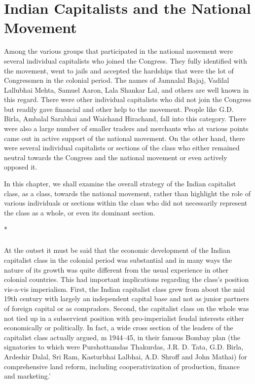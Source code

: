 
\chapter{Indian Capitalists and the National Movement}

Among the various groups that participated in the national movement were several individual capitalists who joined the Congress. They fully identified with the movement, went to jails and accepted the hardships that were the lot of Congressmen in the colonial period. The names of Jamnalal Bajaj, Vadilal Lallubhai Mehta, Samuel Aaron, Lala Shankar Lal, and others are well known in this regard. There were other individual capitalists who did not join the Congress but readily gave financial and other help to the movement. People like G.D. Birla, Ambalal Sarabhai and Waichand Hirachand, fall into this category. There were also a large number of smaller traders and merchants who at various points came out in active support of the national movement. On the other hand, there were several individual capitalists or sections of the class who either remained neutral towards the Congress and the national movement or even actively opposed it. 

In this chapter, we shall examine the overall strategy of the Indian capitalist class, as a class, towards the national movement, rather than highlight the role of various individuals or sections within the class who did not necessarily represent the class as a whole, or even its dominant section.

\begin{center}*\end{center}

\paragraph*{}

At the outset it must be said that the economic development of the Indian capitalist class in the colonial period was substantial and in many ways the nature of its growth was quite different from the usual experience in other colonial countries. This had important implications regarding the class's position vis-a-vis imperialism. First, the Indian capitalist class grew from about the mid 19th century with largely an independent capital base and not as junior partners of foreign capital or as compradors. Second, the capitalist class on the whole was not tied up in a subservient position with pro-imperialist feudal interests either economically or politically. In fact, a wide cross section of the leaders of the capitalist class actually argued, m 1944--45, in their famous Bombay plan (the signatories to which were Purshottamdas Thakurdas, J.R. D. Tata, G.D. Birla, Ardeshir Dalal, Sri Ram, Kasturbhai Lalbhai, A.D. Shroff and John Mathai) for comprehensive land reform, including cooperativization of production, finance and marketing.' 

